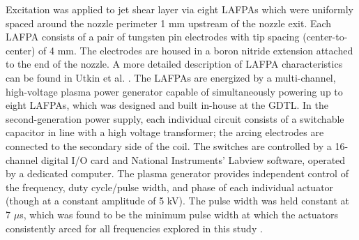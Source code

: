 \documentclass[english]{aiaa-tc}
\begin{document}
Excitation was applied to jet shear layer via eight LAFPAs which were uniformly spaced around the nozzle perimeter 1 mm upstream of the nozzle exit. 
Each LAFPA consists of a pair of tungsten pin electrodes with tip spacing (center-to-center) of 4 mm. 
The electrodes are housed in a boron nitride extension attached to the end of the nozzle. A more detailed description of LAFPA characteristics can be found in Utkin et al. \cite{uyg2007-1}. 
The LAFPAs are energized by a multi-channel, high-voltage plasma power generator capable of simultaneously powering up to eight LAFPAs, which was designed and built in-house at the GDTL. 
In the second-generation power supply, each individual circuit consists of a switchable capacitor in line with a high voltage transformer; the arcing electrodes are connected to the secondary side of the coil. 
The switches are controlled by a 16-channel digital I/O card and National Instruments' Labview software, operated by a dedicated computer. 
The plasma generator provides independent control of the frequency, duty cycle/pulse width, and phase of each individual actuator (though at a constant amplitude of 5 kV). 
The pulse width was held constant at 7 $\mu$s, which was found to be the minimum pulse width at which the actuators consistently arced for all frequencies explored in this study \cite{hkfs-2011}. 
\end{document}
